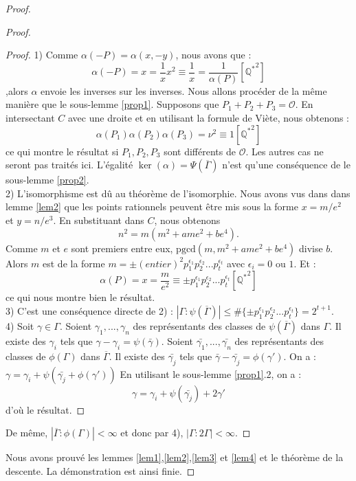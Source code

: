 \documentclass[a4paper]{article}
\begin{document}
\begin{proof}
\begin{proof}
\begin{proof}
1) Comme $\alpha(-P)=\alpha(x,-y)$, nous avons que : 
\begin{equation*}
\alpha(-P)=x=\frac{1}{x}x^2 \equiv \frac{1}{x}=\frac{1}{\alpha(P)} [\mathbb{Q^*}^2]
\end{equation*}
,alors $\alpha$ envoie les inverses sur les inverses.
Nous allons procéder de la même manière que le sous-lemme \ref{prop1}. Supposons que $ P_{1}+P_{2}+P_{3}=\mathcal{O}$. En intersectant $C$ avec une droite et en utilisant la formule de Viète, 
nous obtenons :
\begin{equation*}
\alpha(P_{1})\alpha(P_{2})\alpha(P_{3})=\nu^2 \equiv 1 [\mathbb{Q^*}^2]
\end{equation*}
ce qui montre le résultat si $P_{1},P_{2},P_{3}$ sont différents de $\mathcal{O}$. Les autres cas ne seront pas traités ici.
L'égalité $\ker(\alpha)=\Psi(\overline{\Gamma})$ n'est qu'une conséquence de le sous-lemme \ref{prop2}.
\\
2) L'isomorphisme est dû au théorème de l'isomorphie.
Nous avons vus dans dans lemme \ref{lem2} que les points rationnels peuvent être mis sous la forme $x=m/e^2$ et $y=n/e^3$. En substituant dans $C$, nous obtenons  
\begin{equation*}
n^2=m(m^2+ame^2+be^4).
\end{equation*}
Comme $m$ et $e$ sont premiers entre eux, $\text{pgcd}(m,m^2+ame^2+be^4)$ divise
$b$. Alors $m$ est de la forme $m=\pm(entier)^2p_{1}^{\epsilon_{1}}
p_{2}^{\epsilon_{2}}...p_{t}^{\epsilon_{t}}$ avec $\epsilon_{i}=0$ ou $1$. Et : 
\begin{equation*}
\alpha(P)=x=\frac{m}{e^2} \equiv \pm p_{1}^{\epsilon_{1}}
p_{2}^{\epsilon_{2}}...p_{t}^{\epsilon_{t}} [\mathbb{Q^*}^2]
\end{equation*}
ce qui nous montre bien le résultat. \\
3) C'est une conséquence directe de 2) : $|\Gamma : \psi(\overline{\Gamma})| \leqslant \# \{\pm p_{1}^{\epsilon_{1}}p_{2}^{\epsilon_{2}}...p_{t}^{\epsilon_{t}} \} = 2^{t+1}$. \\
4) Soit $\gamma \in \Gamma$. Soient $\gamma_{1},...,\gamma_{n}$ des représentants des classes de $\psi(\overline{\Gamma})$ dans $\Gamma$. 
Il existe des $\gamma_{i}$ tels que $\gamma-\gamma_{i}=\psi(\bar{\gamma})$. Soient $\bar{\gamma_{1}},...,\bar{\gamma_{n}}$ des représentants des classes de $\phi(\Gamma)$ dans $\overline{\Gamma}$.
Il existe des $\bar{\gamma_{j}}$ tels que $\bar{\gamma}-\bar{\gamma_{j}}=\phi(\gamma')$. On a : $\gamma=\gamma_{i}+\psi(\bar{\gamma_{j}}+\phi(\gamma'))$
En utilisant le sous-lemme \ref{prop1}.2, on a :
\begin{equation*}
\gamma= \gamma_{i}+\psi(\bar{\gamma_{j}})+2\gamma'
\end{equation*}
d'où le résultat.
\end{proof}

\noindent De même, $ |\overline{\Gamma}:\phi(\Gamma)| <\infty$ et donc par 4),
$|\Gamma:2\Gamma|<\infty$. 
\end{proof}
\noindent Nous avons prouvé les lemmes \ref{lem1},\ref{lem2},\ref{lem3} et \ref{lem4} et le théorème de la descente. La démonstration est ainsi finie.
\end{proof}
\end{document}
